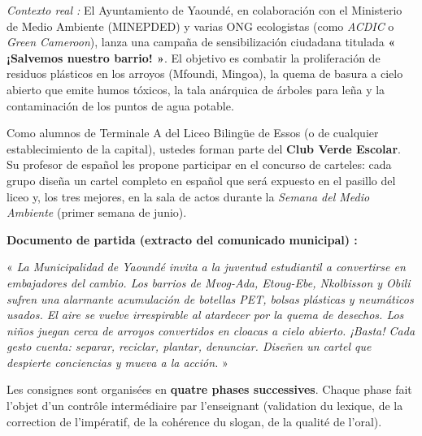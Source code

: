 \documentclass[11pt]{article}
\newcounter{popsec}
\newcounter{popsub}
\newcommand{\courssub}[1]{%
  \stepcounter{popsub}%
  \par\vspace{9pt}\noindent{\popxbold\fontsize{11.5}{13}\selectfont\color{popink}{\color{poporange}\thepopsec.\thepopsub}\hspace{6pt}#1}\par\nopagebreak\vspace{4pt}
}
\begin{document}
\begin{textebox}
\emph{Contexto real :} El Ayuntamiento de Yaoundé, en colaboración con el Ministerio de Medio Ambiente (MINEPDED) y varias ONG ecologistas (como \emph{ACDIC} o \emph{Green Cameroon}), lanza una campaña de sensibilización ciudadana titulada \textbf{« ¡Salvemos nuestro barrio! »}. El objetivo es combatir la proliferación de residuos plásticos en los arroyos (Mfoundi, Mingoa), la quema de basura a cielo abierto que emite humos tóxicos, la tala anárquica de árboles para leña y la contaminación de los puntos de agua potable.

Como alumnos de Terminale A del Liceo Bilingüe de Essos (o de cualquier establecimiento de la capital), ustedes forman parte del \textbf{Club Verde Escolar}. Su profesor de español les propone participar en el concurso de carteles: cada grupo diseña un cartel completo en español que será expuesto en el pasillo del liceo y, los tres mejores, en la sala de actos durante la \emph{Semana del Medio Ambiente} (primer semana de junio).

\medskip
\noindent \textbf{Documento de partida (extracto del comunicado municipal) :}
\medskip

« \emph{La Municipalidad de Yaoundé invita a la juventud estudiantil a convertirse en embajadores del cambio. Los barrios de Mvog-Ada, Etoug-Ebe, Nkolbisson y Obili sufren una alarmante acumulación de botellas PET, bolsas plásticas y neumáticos usados. El aire se vuelve irrespirable al atardecer por la quema de desechos. Los niños juegan cerca de arroyos convertidos en cloacas a cielo abierto. ¡Basta! Cada gesto cuenta: separar, reciclar, plantar, denunciar. Diseñen un cartel que despierte conciencias y mueva a la acción.} » 
\end{textebox}

\courssub{Consignes}

Les consignes sont organisées en \textbf{quatre phases successives}. Chaque phase fait l'objet d'un contrôle intermédiaire par l'enseignant (validation du lexique, de la correction de l'impératif, de la cohérence du slogan, de la qualité de l'oral).
\end{document}
